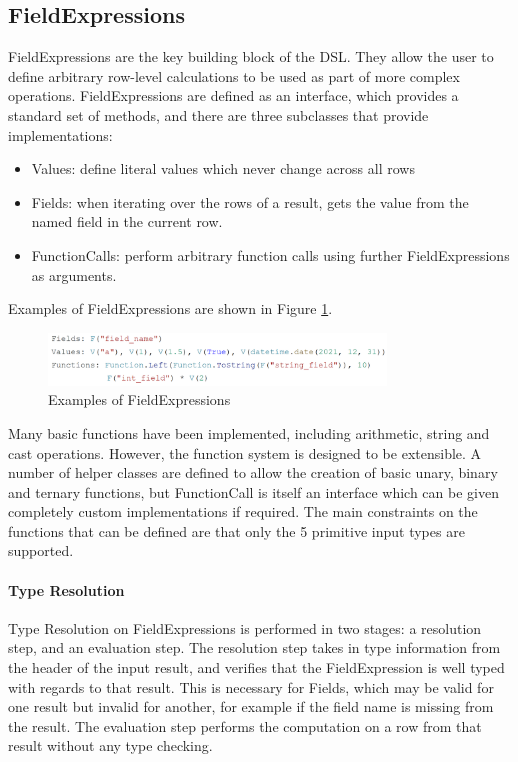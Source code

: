 \subsection{FieldExpressions}
FieldExpressions are the key building block of the DSL. They allow the user to define arbitrary row-level calculations to be used as part of more complex operations. FieldExpressions are defined as an interface, which provides a standard set of methods, and there are three subclasses that provide implementations:

\begin{itemize}
	\item Values: define literal values which never change across all rows
	\item Fields: when iterating over the rows of a result, gets the value from the named field in the current row.
	\item FunctionCalls: perform arbitrary function calls using further FieldExpressions as arguments.
\end{itemize}

Examples of FieldExpressions are shown in Figure \ref{fig:field-expressions-examples}.

\begin{figure}[h]
	\centering
	\includegraphics[width=0.8\textwidth]{chapters/diagrams/implementation/field-expressions-examples}
	\caption{Examples of FieldExpressions}
	\label{fig:field-expressions-examples}
\end{figure}

Many basic functions have been implemented, including arithmetic, string and cast operations. However, the function system is designed to be extensible. A number of helper classes are defined to allow the creation of basic unary, binary and ternary functions, but FunctionCall is itself an interface which can be given completely custom implementations if required. The main constraints on the functions that can be defined are that only the 5 primitive input types are supported.

\paragraph{Type Resolution} 
Type Resolution on FieldExpressions is performed in two stages: a resolution step, and an evaluation step. The resolution step takes in type information from the header of the input result, and verifies that the FieldExpression is well typed with regards to that result. This is necessary for Fields, which may be valid for one result but invalid for another, for example if the field name is missing from the result. The evaluation step performs the computation on a row from that result without any type checking. 

